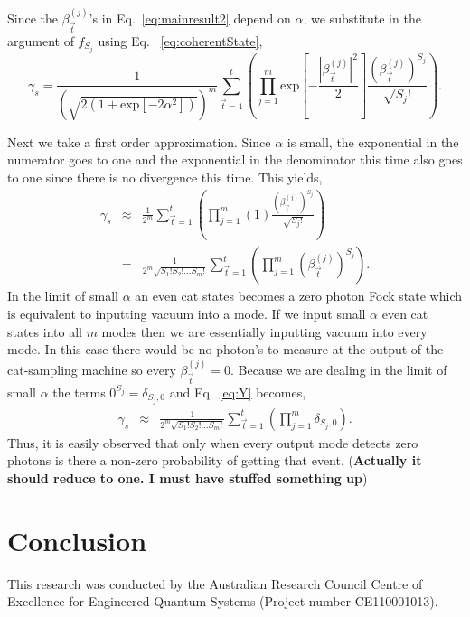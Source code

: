\documentclass[aps,pra,singlecolumn,amsmath,amssymb,nofootinbib,superscriptaddress]{revtex4}
\begin{document}
Since the $\beta_{\vec{t}}^{(j)}$'s in Eq.~\ref{eq:mainresult2} depend on $\alpha$, we substitute in the argument of $f_{S_j}$ using Eq.~ \ref{eq:coherentState},
\begin{equation} 
\gamma_s = \frac{1}{\left(\sqrt{2(1+\mathrm{exp}[-2\alpha^2])}\right)^m} \sum_{\vec{t}=1}^{t} \left(\prod_{j=1}^m \mathrm{exp}\left[-\frac{|\beta_{\vec{t}}^{(j)}|^2}{2}\right] \frac{(\beta_{\vec{t}}^{(j)})^{S_j}}{\sqrt{S_j!}}\right).
\end{equation}

Next we take a first order approximation. Since $\alpha$ is small, the exponential in the numerator goes to one and the exponential in the denominator this time also goes to one since there is no divergence this time. This yields,
\begin{eqnarray} \label{eq:Y}
\gamma_s &\approx& \frac{1}{2^m} \sum_{\vec{t}=1}^{t} \left(\prod_{j=1}^m \left(1\right) \frac{(\beta_{\vec{t}}^{(j)})^{S_j}}{\sqrt{S_j!}}\right) \nonumber \\
&=& \frac{1}{2^m\sqrt{S_1!S_2!\dots S_m!}} \sum_{\vec{t}=1}^{t} \left(\prod_{j=1}^m (\beta_{\vec{t}}^{(j)})^{S_j}\right).
\end{eqnarray}
In the limit of small $\alpha$ an even cat states becomes a zero photon Fock state which is equivalent to inputting vacuum into a mode. If we input small $\alpha$ even cat states into all $m$ modes then we are essentially inputting vacuum into every mode. In this case there would be no photon's to measure at the output of the cat-sampling machine so every $\beta_{\vec{t}}^{(j)}=0$. Because we are dealing in the limit of small $\alpha$ the terms $0^{S_j}=\delta_{S_j,0}$ and Eq.~\ref{eq:Y} becomes,
\begin{eqnarray} \label{}
\gamma_s &\approx& \frac{1}{2^m\sqrt{S_1!S_2!\dots S_m!}} \sum_{\vec{t}=1}^{t} \left(\prod_{j=1}^m \delta_{S_j,0}\right).
\end{eqnarray}
Thus, it is easily observed that only when every output mode detects zero photons is there a non-zero probability of getting that event. (\textbf{Actually it should reduce to one. I must have stuffed something up})
\section{Conclusion}

\begin{acknowledgments}
This research was conducted by the Australian Research Council Centre of Excellence for Engineered Quantum Systems (Project number CE110001013).
\end{acknowledgments}


\end{document}
